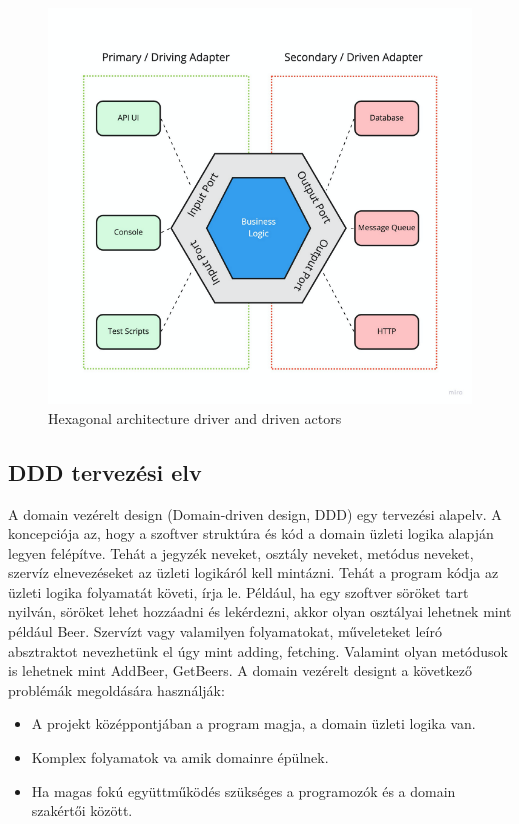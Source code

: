 \begin{figure}[h]
    \centering
    \includegraphics[scale=0.3]{images/ports-adapters}
    \caption{Hexagonal architecture driver and driven actors}
    \label{fig:hexagonal-ports-adapters}
\end{figure}

\subsection{DDD tervezési elv}
A domain vezérelt design (Domain-driven design, DDD) \cite{wiki:Domain-driven_design} egy tervezési alapelv.
A koncepciója az, hogy a szoftver struktúra és kód a domain üzleti logika alapján legyen felépítve.
Tehát a jegyzék neveket, osztály neveket, metódus neveket, szervíz elnevezéseket az üzleti logikáról kell mintázni.
Tehát a program kódja az üzleti logika folyamatát követi, írja le.
Például, ha egy szoftver söröket tart nyilván, söröket lehet hozzáadni és lekérdezni, akkor olyan osztályai lehetnek mint például Beer.
Szervízt vagy valamilyen folyamatokat, műveleteket leíró absztraktot nevezhetünk el úgy mint adding, fetching.
Valamint olyan metódusok is lehetnek mint AddBeer, GetBeers.
A domain vezérelt designt a következő problémák megoldására használják:

\begin{itemize}
    \item A projekt középpontjában a program magja, a domain üzleti logika van.
    \item Komplex folyamatok va amik domainre épülnek.
    \item Ha magas fokú együttműködés szükséges a programozók és a domain szakértői között.
\end{itemize}

